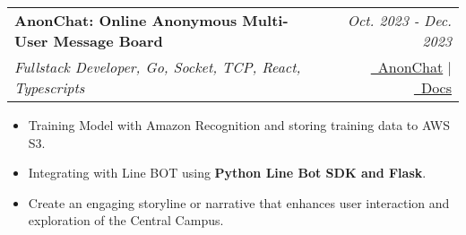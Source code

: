 \documentclass[a4paper,11pt]{article}
\makeatletter
\newcommand{\resumeSubheading}[4]{
\vspace{0.5mm}\item
    \begin{tabular*}{0.98\textwidth}[t]{l@{\extracolsep{\fill}}r}
        \textbf{#1} & \textit{\footnotesize{#4}} \\
        \textit{\footnotesize{#3}} &  \footnotesize{#2}\\
    \end{tabular*}
    \vspace{-2.4mm}
}
\newcommand{\resumeItemListStart}{\begin{justify}\begin{itemize}[
    leftmargin=3ex, 
    rightmargin=2ex, 
    noitemsep,
    labelsep=1.2mm,
    itemsep=0.5mm
    ]\small
}
\newcommand{\resumeItemListEnd}{\end{itemize}\end{justify}\vspace{-2mm}}
\makeatother
\begin{document}
        \vspace{-2.0mm}
            
        \resumeSubheading
            { AnonChat: Online Anonymous Multi-User Message Board} 
            {
                \href{https://github.com/1chooo/anon-chat}{\faGithub\ AnonChat} 
                |
                \href{https://1chooo.github.io/anon-chat/}{\textcolor{black}{\faDesktop}\ Docs} 
            } %
            {Fullstack Developer, Go, Socket, TCP, React, Typescripts} %
            {Oct. 2023 - Dec. 2023} %
            
            \vspace{-1.0mm}
            
            \resumeItemListStart
                \item {Training Model with Amazon Recognition and storing training data to AWS S3.}
                \item {Integrating with Line BOT using \textbf{Python Line Bot SDK and Flask}.}
                \item {Create an engaging storyline or narrative that enhances user interaction and exploration of the Central Campus.}
            \resumeItemListEnd
        \vspace{-2.0mm}

            
            
            
\end{document}
